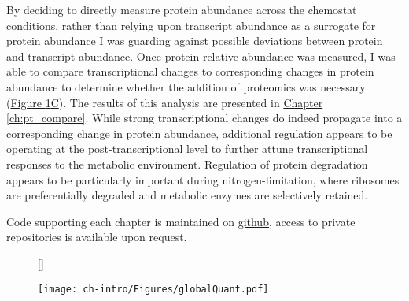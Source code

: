 By deciding to directly measure protein abundance across the chemostat conditions, rather than relying upon transcript abundance as a surrogate for protein abundance I was guarding against possible deviations between protein and transcript abundance. Once protein relative abundance was measured, I was able to compare transcriptional changes to corresponding changes in protein abundance to determine whether the addition of proteomics was necessary (\hyperref[introFig:primarytopics]{Figure \ref{introFig:primarytopics}C}). The results of this analysis are presented in \hyperref[ch:pt_compare]{Chapter \ref{ch:pt_compare}}.  While strong transcriptional changes do indeed propagate into a corresponding change in protein abundance, additional regulation appears to be operating at the post-transcriptional level to further attune transcriptional responses to the metabolic environment. Regulation of protein degradation appears to be particularly important during nitrogen-limitation, where ribosomes are preferentially degraded and metabolic enzymes are selectively retained.

Code supporting each chapter is maintained on \href{https://github.com/shackett}{github}, access to private repositories is available upon request.

\begin{figure}[h!]
[\FBwidth]
{\caption[Summary of primary thesis topics]{}\label{introFig:primarytopics}}
{\texttt{[image: ch-intro/Figures/globalQuant.pdf]}}
\end{figure}

